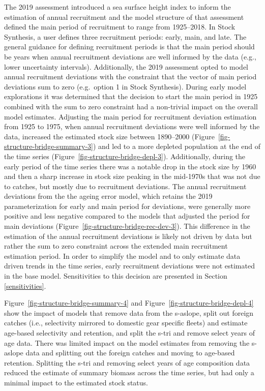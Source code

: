 \documentclass[
  english,
]{article}
\begin{document}
The 2019 assessment introduced a sea surface height index to inform the
estimation of annual recruitment and the model structure of that
assessment defined the main period of recruitment to range from
1925--2018. In Stock Synthesis, a user defines three recruitment
periods: early, main, and late. The general guidance for defining
recruitment periods is that the main period should be years when annual
recruitment deviations are well informed by the data (e.g., lower
uncertainty intervals). Additionally, the 2019 assessment opted to model
annual recruitment deviations with the constraint that the vector of
main period deviations sum to zero (e.g.~option 1 in Stock Synthesis).
During early model explorations it was determined that the decision to
start the main period in 1925 combined with the sum to zero constraint
had a non-trivial impact on the overall model estimates. Adjusting the
main period for recruitment deviation estimation from 1925 to 1975, when
annual recruitment deviations were well informed by the data, increased
the estimated stock size between 1890--2000
(Figure~\ref{fig-structure-bridge-summary-3}) and led to a more depleted
population at the end of the time series
(Figure~\ref{fig-structure-bridge-depl-3}). Additionally, during the
early period of the time series there was a notable drop in the stock
size by 1960 and then a sharp increase in stock size peaking in the
mid-1970s that was not due to catches, but mostly due to recruitment
deviations. The annual recruitment deviations from the the ageing error
model, which retains the 2019 parameterization for early and main period
for deviations, were generally more positive and less negative compared
to the models that adjusted the period for main deviations
(Figure~\ref{fig-structure-bridge-rec-dev-3}). This difference in the
estimation of the annual recruitment deviations is likely not driven by
data but rather the sum to zero constraint across the extended main
recruitment estimation period. In order to simplify the model and to
only estimate data driven trends in the time series, early recruitment
deviations were not estimated in the base model. Sensitivities to this
decision are presented in Section \ref{sensitivities}.

Figure~\ref{fig-structure-bridge-summary-4} and
Figure~\ref{fig-structure-bridge-depl-4} show the impact of models that
remove data from the \gls{s-aslope}, split out foreign catches (i.e.,
selectivity mirrored to domestic gear specific fleets) and estimate
age-based selectivity and retention, and split the \gls{s-tri} and
remove select years of age data. There was limited impact on the model
estimates from removing the \gls{s-aslope} data and splitting out the
foreign catches and moving to age-based retention. Splitting the
\gls{s-tri} and removing select years of age composition data reduced
the estimate of summary biomass across the time series, but had only a
minimal impact to the estimated stock status.
\end{document}
